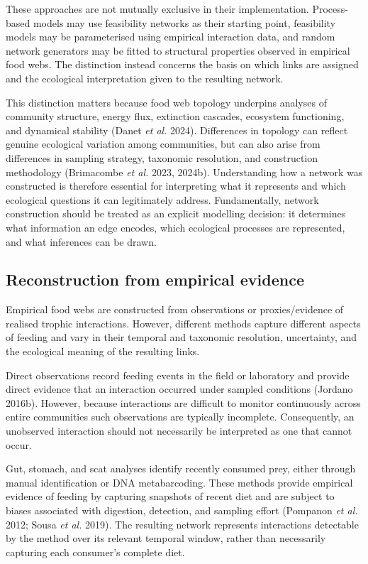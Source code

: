 \documentclass[
]{article}
\begin{document}
These approaches are not mutually exclusive in their implementation.
Process-based models may use feasibility networks as their starting
point, feasibility models may be parameterised using empirical
interaction data, and random network generators may be fitted to
structural properties observed in empirical food webs. The distinction
instead concerns the basis on which links are assigned and the
ecological interpretation given to the resulting network.

This distinction matters because food web topology underpins analyses of
community structure, energy flux, extinction cascades, ecosystem
functioning, and dynamical stability (Danet \emph{et al.} 2024).
Differences in topology can reflect genuine ecological variation among
communities, but can also arise from differences in sampling strategy,
taxonomic resolution, and construction methodology (Brimacombe \emph{et
al.} 2023, 2024b). Understanding how a network was constructed is
therefore essential for interpreting what it represents and which
ecological questions it can legitimately address. Fundamentally, network
construction should be treated as an explicit modelling decision: it
determines what information an edge encodes, which ecological processes
are represented, and what inferences can be drawn.

\subsection{Reconstruction from empirical
evidence}\label{sec-construct-empirical}

Empirical food webs are constructed from observations or
proxies/evidence of realised trophic interactions. However, different
methods capture different aspects of feeding and vary in their temporal
and taxonomic resolution, uncertainty, and the ecological meaning of the
resulting links.

Direct observations record feeding events in the field or laboratory and
provide direct evidence that an interaction occurred under sampled
conditions (Jordano 2016b). However, because interactions are difficult
to monitor continuously across entire communities such observations are
typically incomplete. Consequently, an unobserved interaction should not
necessarily be interpreted as one that cannot occur.

Gut, stomach, and scat analyses identify recently consumed prey, either
through manual identification or DNA metabarcoding. These methods
provide empirical evidence of feeding by capturing snapshots of recent
diet and are subject to biases associated with digestion, detection, and
sampling effort (Pompanon \emph{et al.} 2012; Sousa \emph{et al.} 2019).
The resulting network represents interactions detectable by the method
over its relevant temporal window, rather than necessarily capturing
each consumer's complete diet.
\end{document}
